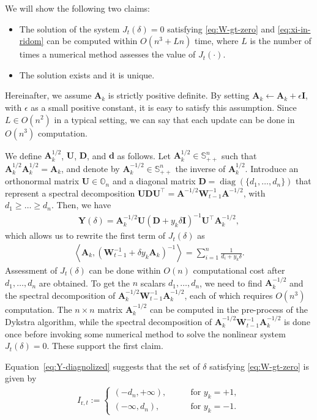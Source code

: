 \documentclass[10pt,onecolumn]{article}
\theoremstyle{definition}
\theoremstyle{definition}
\theoremstyle{definition}
\theoremstyle{definition}
\theoremstyle{definition}
\theoremstyle{theorem}
\newcommand{\0}{{\bm{0}}}
\newcommand{\1}{{\bm{1}}}
\newcommand{\vd}{{\bm{d}}}
\newcommand{\vA}{{\bm{A}}}
\newcommand{\vD}{{\bm{D}}}
\newcommand{\vI}{{\bm{I}}}
\newcommand{\bO}{{\mathbb{O}}}
\newcommand{\bS}{{\mathbb{S}}}
\newcommand{\vU}{{\bm{U}}}
\newcommand{\vW}{{\bm{W}}}
\newcommand{\Y}{{\bm{Y}}}
\DeclareMathOperator{\diag}{diag}
\begin{document}
We will show the following two claims:
%
\begin{itemize}
\item The solution of the
system $J_{t}(\delta)=0$ satisfying \eqref{eq:W-gt-zero}
and \eqref{eq:xi-in-ridom} can be
computed within $O(n^{3}+Ln)$ time, where $L$ is
the number of times a numerical method assesses the value of
$J_{t}(\cdot)$.
\\
\item The solution exists and it is unique.
\end{itemize}
%
Hereinafter, we assume $\vA_{k}$ is strictly positive definite.
By setting
$\vA_{k} \leftarrow \vA_{k} + \epsilon \vI$, with $\epsilon$ as a small positive
constant, it is easy to satisfy this assumption.
Since $L \in O(n^{2})$ in a typical setting, we can say that
each update can be done in $O(n^{3})$ computation.

We define $\vA^{1/2}_{k}$, $\vU$, $\vD$, and $\vd$ as follows.
Let $\vA_{k}^{1/2}\in\bS_{++}^{n}$
such that $\vA_{k}^{1/2}\vA_{k}^{1/2}=\vA_{k}$, and
denote by $\vA_{k}^{-1/2}\in\bS_{++}^{n}$ the inverse of $\vA_{k}^{1/2}$.
Introduce an orthonormal matrix $\vU\in\bO_{n}$ and
a diagonal matrix $\vD=\diag(\{d_{1},\dots,d_{n}\})$ that
represent a spectral decomposition
$\vU\vD\vU^{\top} = \vA^{-1/2}\vW_{t-1}^{-1}\vA^{-1/2}$,
with $d_{1}\ge\dots\ge d_{n}$.
Then, we have
%
\begin{align}\label{eq:Y-diagnolized}
\Y(\delta) =
\vA_{k}^{-1/2} \vU
(\vD + y_{k} \delta \vI)^{-1} \vU^{\top} \vA_{k}^{-1/2},
\end{align}
%
which allows us to rewrite the first term of $J_{t}(\delta)$ as
%
\begin{align}\label{eq:dotprod-linear-comp}
\left<\vA_k,
(\vW_{t-1}^{-1} + \delta y_{k} \vA_k)^{-1}
\right>
=
\sum_{i=1}^{n}\frac{1}{d_{i}+y_{k}\delta}.
\end{align}
%
Assessment of $J_{t}(\delta)$ can be
done within $O(n)$ computational cost after $d_{1},\dots,d_{n}$ are obtained.
To get the $n$ scalars $d_{1},\dots,d_{n}$,
we need to find $\vA_k^{-1/2}$ and the
spectral decomposition of $\vA^{-1/2}_k\vW_{t-1}^{-1}\vA^{-1/2}_k$,
each of which requires $O(n^{3})$ computation.
The $n\times n$ matrix $\vA^{-1/2}_{k}$ can be computed
in the pre-process of the Dykstra algorithm, while
the spectral decomposition of $\vA^{-1/2}_k\vW_{t-1}^{-1}\vA^{-1/2}_k$
is done once before invoking some numerical method to
solve the nonlinear system $J_{t}(\delta)=0$. These support the first claim.

Equation~\eqref{eq:Y-diagnolized} suggests that
the set of $\delta$ satisfying \eqref{eq:W-gt-zero}
is given by
%
\begin{align}\label{eq:int-nlrsys-for-upd-alph}
I_{\text{r},t} :=
\begin{cases}
( -d_{n},+\infty ), &\qquad \text{for $y_{k}=+1$},
\\
( -\infty, d_{n} ), &\qquad \text{for $y_{k}=-1$}.
\end{cases}
\end{align}
\end{document}
